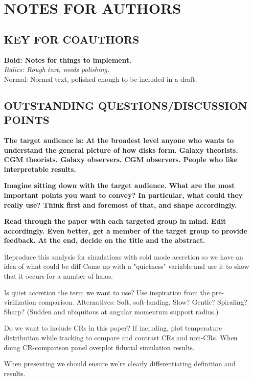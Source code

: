 \documentclass[fleqn,usenatbib]{mnras}
\begin{document}
\section{NOTES FOR AUTHORS}

\subsection{KEY FOR COAUTHORS}
\textbf{Bold: Notes for things to implement.} \\
\textit{Italics: Rough text, needs polishing.} \\
Normal: Normal text, polished enough to be included in a draft.

\subsection{OUTSTANDING QUESTIONS/DISCUSSION POINTS}

\textbf{
The target audience is:
At the broadest level anyone who wants to understand the general picture of how disks form.
Galaxy theorists.
CGM theorists.
Galaxy observers.
CGM observers.
People who like interpretable results.
}

\textbf{
Imagine sitting down with the target audience.
What are the most important points you want to convey?
In particular, what could they really use?
Think first and foremost of that, and shape accordingly.
}

\textbf{
Read through the paper with each targeted group in mind.
Edit accordingly.
Even better, get a member of the target group to provide feedback.
}
\textbf{
At the end, decide on the title and the abstract.
}

Reproduce this analysis for simulations with cold mode accretion so we have an idea of what could be diff
Come up with a "quietness" variable and use it to show that it occurs for a number of halos.

Is quiet accretion the term we want to use?
Use inspiration from the pre-virilization comparison.
Alternatives:
Soft, soft-landing.
Slow?
Gentle?
Spiraling?
Sharp? (Sudden and ubiquitous at angular momentum support radius.)

Do we want to include CRs in this paper?
If including, plot temperature distribution while tracking to compare and contrast CRs and non-CRs.
When doing CR-comparison panel overplot fiducial simulation results.

When presenting we should ensure we're clearly differentiating definition and results.
\end{document}
